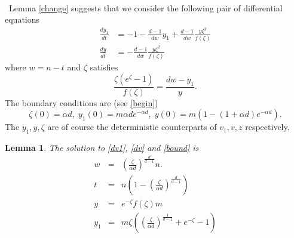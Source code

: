 \documentclass[11pt]{article}
\def\a{\alpha}
\def\z{\zeta}
\newtheorem{lemma}[theorem]{Lemma}
\newcommand{\brac}[1]{\left(#1\right)}
\newcommand{\bfrac}[2]{\brac{\frac{#1}{#2}}}
\newcommand{\beq}[1]{\begin{equation}\label{#1}}
\newcommand{\eeq}{\end{equation}}
\begin{document}
\\\
Lemma \ref{change} suggests that we consider the following pair of differential equations
\begin{align}
\frac{dy_1}{dt} &= -1 -\frac{d-1}{dw}y_1 + \frac{d-1}{dw}\frac{y\z^2}{f(\z)}\label{dv1}\\
\frac{dy}{dt} &=  -\frac{d-1}{dw}\frac{y\z^2}{f(\z)}\label{dv}
\end{align}
where $w = n-t$ and $\z$ satisfies 
\beq{13}
\frac{\z(e^\z-1)}{f(\z)}=\frac{dw-y_1}{y}.
\eeq
The boundary conditions are (see \eqref{begin})
\beq{bound}
\z(0)=\a d,\;y_1(0)= m \a de^{-\a d},\;y(0)= m(1-(1+\a d)e^{-\a d}).
\eeq
The $y_1,y,\z$ are of course the deterministic counterparts of $v_1,v,z$ respectively.

\begin{lemma}\label{lemde}
The solution to \eqref{dv1}, \eqref{dv} and \eqref{bound} is
\begin{eqnarray}
w&=&\bfrac{\z}{\a d}^{\frac{d}{d-1}}n.\label{zw}\\
t&=&n\brac{1-\bfrac{\z}{\a d}^{\frac{d}{d-1}}}\label{zw1}\\
y&=& e^{-\z}f(\z)m\label{v-form}\\
y_1&=&m\z\brac{\bfrac{\z}{\a d}^{\frac{1}{d-1}} + e^{-\z}-1}\label{sad}
\end{eqnarray}
\end{lemma}
\end{document}
